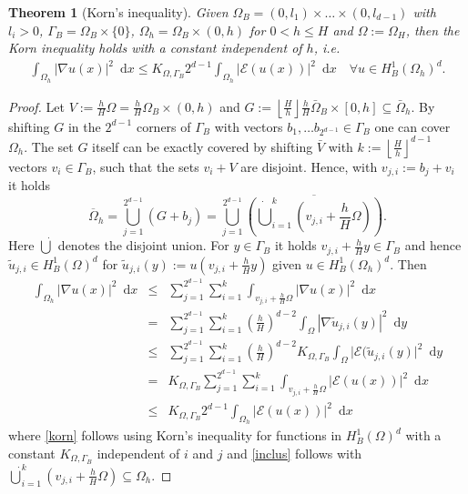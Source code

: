 \documentclass[a4paper,11pt]{article}
\newtheorem{theorem}{Theorem}%
\theoremstyle{remark}
\newcommand{\dx}{\text{ d}x}
\newcommand{\dy}{\text{ d}y}
\begin{document}
\begin{theorem}[Korn's inequality]
  \label{kornIE}
  Given 
$\Omega_B=(0,l_1)\times \ldots \times (0,l_{d-1})$ with $l_i>0$, $ \Gamma_B=\Omega_B\times \{ 0 \}$, $\Omega_h=\Omega_B\times (0,h)$  for $0<h\leq H$ and $\Omega:=\Omega_H$, then the Korn inequality holds with a constant independent of $h$, i.e.
\begin{eqnarray}
  \int_{\Omega_h} |\nabla u(x)|^2 \, \dx
     \leq
  K_{\Omega,\Gamma_B } 2^ {d-1}\int_{\Omega_{h}} \lvert \mathcal{E}(u(x)) \rvert^2 \, \dx
\quad \forall u\in H^1_B(\Omega_h)^d .
  \label{kornNew}
\end{eqnarray}
\end{theorem}
\begin{proof}
  Let
  $V := \tfrac hH \Omega
  =  \tfrac hH \Omega_B \times (0,h) $
  and
  $ G:= \left\lfloor \frac{H}{h} \right\rfloor
  \tfrac hH \bar \Omega_B \times [0,h] 
  \subseteq \bar \Omega_h$.
  By shifting $G$ in the $2^{d-1}$ corners  of
  $\Gamma_B$ with vectors
  $b_1,\ldots b_{2^{d-1}}\in   \Gamma_B$
  one can cover  $\Omega_h$.
 The set $G$ itself can be exactly covered by shifting $\bar V$
 with
  $k := \left\lfloor \frac{H}{h} \right\rfloor^{d-1}$
  vectors
  $v_i \in \Gamma_B$, such that the sets
  $v_i +V$ are disjoint. 
  Hence, with $v_{j,i}:= b_j+v_i$ it holds
$$
\overline{\Omega}_h
= \bigcup_{j=1}^{2^{d-1}} { ( G+b_j) }
= \bigcup_{j=1}^{2^{d-1}} \overline{ (\dot{\bigcup}_{i=1}^{k} \left( v_{j,i} + \frac{h}{H} \Omega \right) )}
.
$$
Here \(\dot{\bigcup}\) denotes the disjoint union.
For $y \in \Gamma_B$ it holds
$v_{j,i} + \frac{h}{H} y\in \Gamma_B$ and hence
$\tilde{u}_{j,i} \in H^1_B(\Omega)^d $ for
$
\tilde{u}_{j,i}(y) :=u\left(v_{j,i} + \frac{h}{H} y\right)$ given $u\in H^1_B(\Omega_h)^d $. Then
\begin{eqnarray}
\int_{\Omega_h} |\nabla u(x)|^2 \, \dx
  &\leq& \sum_{j=1}^{2^{d-1}} \sum_{i=1}^{k} \int_{v_{j,i} + \frac{h}{H} \Omega} |\nabla u(x)|^2 \, \dx
\nonumber \\  &=&
\sum_{j=1}^{2^{d-1}} \sum_{i=1}^{k} \left( \frac{h}{H} \right)^{d-2} \int_{\Omega} |\nabla \tilde{u}_{j,i}(y)|^2 \, \dy 
\nonumber  \\
  &\leq& \sum_{j=1}^{2^{d-1}} \sum_{i=1}^{k} \left( \frac{h}{H} \right)^{d-2} K_{\Omega,\Gamma_B } \int_{\Omega} \lvert \mathcal{E}(\tilde{u}_{j,i}(y) \rvert^2 \, \dy
\label{korn}\\
&=& K_{\Omega,\Gamma_B }\sum_{j=1}^{2^{d-1}}  \sum_{i=1}^{k}  \int_{v_{j,i} + \frac{h}{H}\Omega} \lvert \mathcal{E}(u(x)) \rvert^2 \, \dx
\nonumber \\  &\leq &
K_{\Omega,\Gamma_B } 2^ {d-1}\int_{\Omega_{h}} \lvert \mathcal{E}(u(x)) \rvert^2 \, \dx
\label{inclus}
\end{eqnarray}
where \eqref{korn} follows using Korn's inequality for functions in $H^1_B(\Omega)^d $ with a constant $K_{\Omega,\Gamma_B }$ independent of $i$ and $j$ and \eqref{inclus} follows with $\dot\bigcup_{i=1}^{k} \left( v_{j, i} + \frac{h}{H} \Omega \right )  \subseteq \Omega_{h}$.
\end{proof}
\end{document}
